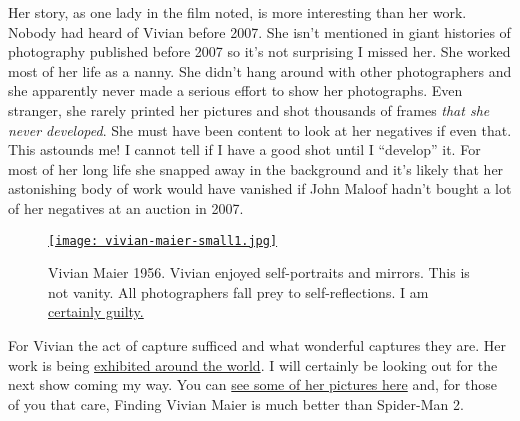 Her story, as one lady in the film noted, is more interesting than her
work. Nobody had heard of Vivian before 2007. She isn't mentioned in
giant histories of photography published before 2007 so it's not
surprising I missed her. She worked most of her life as a nanny. She
didn't hang around with other photographers and she apparently never
made a serious effort to show her photographs. Even stranger, she rarely
printed her pictures and shot thousands of frames \emph{that she never
developed}. She must have been content to look at her negatives if even
that. This astounds me! I cannot tell if I have a good shot until I
``develop'' it. For most of her long life she snapped away in the
background and it's likely that her astonishing body of work would have
vanished if John Maloof hadn't bought a lot of her negatives at an
auction in 2007.

\captionsetup[figure]{labelformat=empty}
\begin{SCfigure}[30] %
\centering
\href{http://www.vivianmaier.com/gallery/self-portraits/\#slide-33}{\texttt{[image: vivian-maier-small1.jpg]}}
\caption{Vivian Maier 1956. Vivian enjoyed self-portraits and mirrors. This is
not vanity. All photographers fall prey to self-reflections. I am
\href{http://conceptcontrol.smugmug.com/People/The-Way-We-Were/i-B3qJtKz/A}{certainly
guilty.}}
\label{fig:4711X0}
\end{SCfigure}

For Vivian the act of capture sufficed and what wonderful captures they
are. Her work is being
\href{http://www.vivianmaier.com/exhibitions-events/}{exhibited around
the world}. I will certainly be looking out for the next show coming my
way. You can \href{http://www.vivianmaier.com/}{see some of her pictures
here} and, for those of you that care, Finding Vivian Maier is much
better than Spider-Man 2.




%